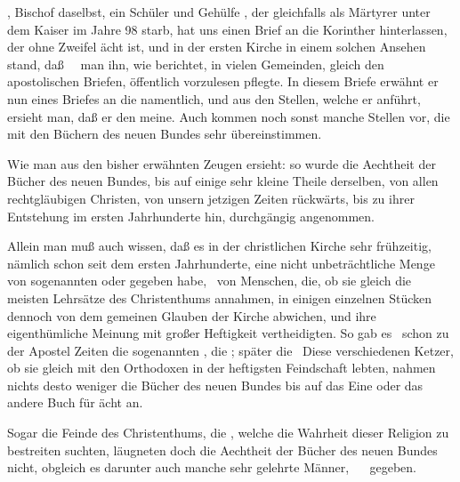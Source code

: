 \begin{aufza}
\item {}, Bischof daselbst, ein Schüler und Gehülfe , der gleichfalls als Märtyrer unter dem Kaiser  im Jahre 98 starb, hat uns einen Brief an die Korinther hinterlassen, der ohne Zweifel ächt ist, und in der ersten Kirche in einem solchen Ansehen stand, daß~ \ man ihn, wie  berichtet, in vielen Gemeinden, gleich den apostolischen Briefen, öffentlich vorzulesen pflegte. In diesem Briefe erwähnt er nun eines Briefes  an die  namentlich, und aus den Stellen, welche er anführt, ersieht man, daß er den  meine. Auch kommen noch sonst manche Stellen vor, die mit den Büchern des neuen Bundes sehr übereinstimmen.
\end{aufza}

\begin{aufza}
\item Wie man aus den bisher erwähnten Zeugen ersieht: so wurde die Aechtheit der Bücher des neuen Bundes, bis auf einige sehr kleine Theile derselben, von allen rechtgläubigen Christen, von unsern jetzigen Zeiten rückwärts, bis zu ihrer Entstehung im ersten Jahrhunderte hin, durchgängig angenommen.
\item Allein man muß auch wissen, daß es in der christlichen Kirche sehr frühzeitig, nämlich schon seit dem ersten Jahrhunderte, eine nicht unbeträchtliche Menge von sogenannten  oder  gegeben habe, \dh\ von Menschen, die, ob sie gleich die meisten Lehrsätze des Christenthums annahmen, in einigen einzelnen Stücken dennoch von dem gemeinen Glauben der Kirche abwichen, und ihre eigenthümliche Meinung mit großer Heftigkeit vertheidigten. So gab es \zB\ schon zu der Apostel Zeiten die sogenannten , die ; später die  \uA\ Diese verschiedenen Ketzer, ob sie gleich mit den Orthodoxen in der heftigsten Feindschaft lebten, nahmen nichts desto weniger die Bücher des neuen Bundes bis auf das Eine oder das andere Buch für ächt an.
\item Sogar die Feinde des Christenthums, die , welche die Wahrheit dieser Religion zu bestreiten suchten, läugneten doch die Aechtheit der Bücher des neuen Bundes nicht, obgleich es darunter auch manche sehr gelehrte Männer, \zB\  \uA\ gegeben.~
\end{aufza}

